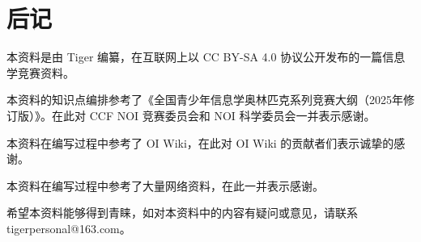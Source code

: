 \chapter{后记}

本资料是由 Tiger 编纂，在互联网上以 CC BY-SA 4.0 协议公开发布的一篇信息学竞赛资料。

本资料的知识点编排参考了《全国青少年信息学奥林匹克系列竞赛大纲（2025年修订版）》。在此对 CCF NOI 竞赛委员会和 NOI 科学委员会一并表示感谢。

本资料在编写过程中参考了 OI Wiki，在此对 OI Wiki 的贡献者们表示诚挚的感谢。

本资料在编写过程中参考了大量网络资料，在此一并表示感谢。

希望本资料能够得到青睐，如对本资料中的内容有疑问或意见，请联系 tigerpersonal@163.com。